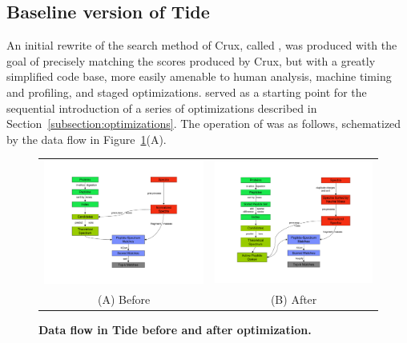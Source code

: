 \subsection{Baseline version of Tide \label{subsection:tidezero}}

An initial rewrite of the search method of Crux, called \tidezero, was
produced with the goal of precisely matching the \XCorr scores
produced by Crux, but with a greatly simplified code base, more easily
amenable to human analysis, machine timing and profiling, and staged
optimizations.  \tidezero served as a starting point for the
sequential introduction of a series of optimizations described in
Section~\ref{subsection:optimizations}. The operation of \tidezero was as
follows, schematized by the data flow in Figure~\ref{figure:dataflow}(A).

\begin{figure}
\centering
\begin{tabular}{cc}
\includegraphics[width=3.0in]{Diagrams_p1-p1-cropped.pdf} &
\includegraphics[width=3.0in]{Diagrams_p2-p2-cropped.pdf} \\
(A) Before & (B) After \\
\end{tabular}
\caption{{\bf Data flow in Tide before and after optimization.}
  \label{figure:dataflow}}
\end{figure}

